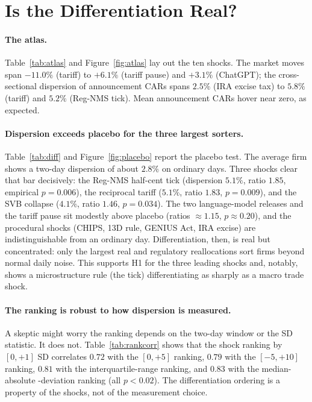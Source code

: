 \documentclass[12pt]{article}
\begin{document}
\section{Is the Differentiation Real?}\label{sec:diff}
\paragraph{The atlas.} Table~\ref{tab:atlas} and Figure~\ref{fig:atlas} lay out the ten shocks. The
market moves span $-11.0\%$ (tariff) to $+6.1\%$ (tariff pause) and $+3.1\%$ (ChatGPT); the
cross-sectional dispersion of announcement CARs spans $2.5\%$ (IRA excise tax) to $5.8\%$ (tariff)
and $5.2\%$ (Reg-NMS tick). Mean announcement CARs hover near zero, as expected.

\paragraph{Dispersion exceeds placebo for the three largest sorters.} Table~\ref{tab:diff} and
Figure~\ref{fig:placebo} report the placebo test. The average firm shows a two-day dispersion of
about $2.8\%$ on ordinary days. Three shocks clear that bar decisively: the Reg-NMS half-cent tick
(dispersion $5.1\%$, ratio $1.85$, empirical $p=0.006$), the reciprocal tariff ($5.1\%$, ratio
$1.83$, $p=0.009$), and the SVB collapse ($4.1\%$, ratio $1.46$, $p=0.034$). The two language-model
releases and the tariff pause sit modestly above placebo (ratios $\approx 1.15$, $p\approx 0.20$),
and the procedural shocks (CHIPS, 13D rule, GENIUS Act, IRA excise) are indistinguishable from an
ordinary day. Differentiation, then, is real but concentrated: only the largest real and regulatory
reallocations sort firms beyond normal daily noise. This supports H1 for the three leading shocks
and, notably, shows a microstructure rule (the tick) differentiating as sharply as a macro trade
shock.

\paragraph{The ranking is robust to how dispersion is measured.} A skeptic might worry the ranking
depends on the two-day window or the SD statistic. It does not. Table~\ref{tab:rankcorr} shows that
the shock ranking by $[0,+1]$ SD correlates $0.72$ with the $[0,+5]$ ranking, $0.79$ with the
$[-5,+10]$ ranking, $0.81$ with the interquartile-range ranking, and $0.83$ with the median-absolute
-deviation ranking (all $p<0.02$). The differentiation ordering is a property of the shocks, not of
the measurement choice.
\end{document}
